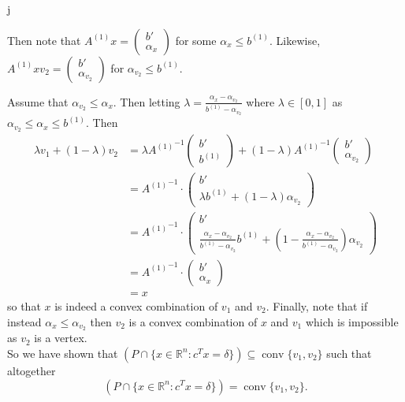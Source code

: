 j\documentclass[11pt]{article}
\DeclareMathOperator{\conv}{conv}
\newcommand{\setR}{\mathbb{R}}
\renewcommand{\leq}{\leqslant}
\begin{document}
\begin{enumerate}[1)]
\begin{solution}
Then note that $ A^{(1)} x =  \begin{pmatrix} b' \\ \alpha_x\end{pmatrix}$ for some $\alpha_x \leq b^{(1)}$. Likewise,  $ A^{(1)} xv_2=  \begin{pmatrix} b' \\ \alpha_{v_2}\end{pmatrix}$ for $\alpha_{v_2} \leq b^{(1)}$. 

Assume that $\alpha_{v_2} \leq \alpha_x$. Then letting $\lambda = \frac{\alpha_x - \alpha_{v_2}}{b^{(1)}- \alpha_{v_2}}$ where $\lambda \in [0,1]$ as $\alpha_{v_2} \leq \alpha_x \leq b^{(1)}$. Then 
\begin{align*}
\lambda v_1 + (1- \lambda)v_2 & = \lambda {A^{(1)}}^{-1}\begin{pmatrix} b' \\ b^{(1)} \end{pmatrix} + (1 - \lambda) {A^{(1)}}^{-1}\begin{pmatrix} b' \\ \alpha_{v_2} \end{pmatrix} \\
& = {A^{(1)}}^{-1} \cdot \begin{pmatrix} b' \\ \lambda b^{(1)}  + (1-\lambda) \alpha_{v_2}\end{pmatrix} \\
& = {A^{(1)}}^{-1} \cdot \begin{pmatrix} b' \\ \frac{\alpha_x - \alpha_{v_2}}{b^{(1)}- \alpha_{v_2}} b^{(1)}  + \left(1-\frac{\alpha_x - \alpha_{v_2}}{b^{(1)}- \alpha_{v_2}}\right) \alpha_{v_2}\end{pmatrix} \\
& = {A^{(1)}}^{-1} \cdot \begin{pmatrix} b' \\ \alpha_x \end{pmatrix} \\
& = x
\end{align*}
so that $x$ is indeed a convex combination of $v_1$ and $v_2$. Finally, note that if instead $\alpha_{x} \leq \alpha_{v_2}$ then $v_2$ is a convex combination of $x$ and $v_1$ which is impossible as $v_2$ is a vertex. 
\\


So we have shown that $(P \cap \{x \in \setR^n: c^Tx = \delta\}) \subseteq \conv\{v_1, v_2\}$ such that altogether $$(P \cap \{x \in \setR^n: c^Tx = \delta\}) = \conv\{v_1, v_2\}.$$






\end{solution}
\end{enumerate}
\end{document}
